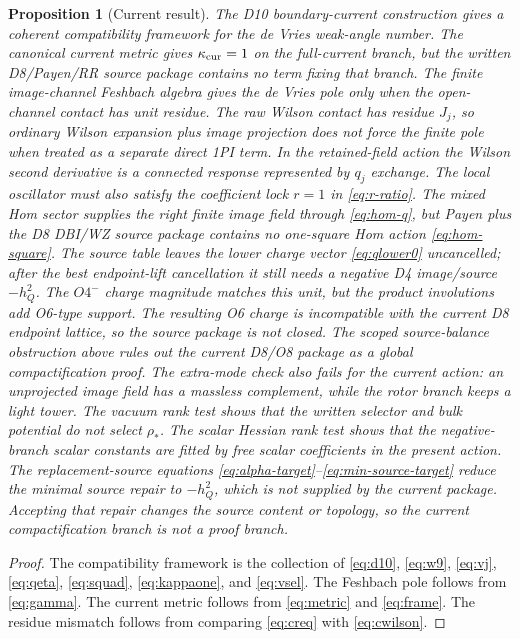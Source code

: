 \documentclass[11pt]{article}
\theoremstyle{plain}
\newtheorem{proposition}{Proposition}[section]
\theoremstyle{definition}
\begin{document}
\begin{proposition}[Current result]
The D10 boundary-current construction gives a coherent compatibility framework
for the de Vries weak-angle number.  The canonical current metric gives
\(\kappa_{\rm cur}=1\) on the full-current branch, but the written D8/Payen/RR
source package contains no term fixing that branch.  The finite image-channel
Feshbach algebra gives the de Vries pole only when the open-channel contact has
unit residue.  The raw Wilson contact has residue \(J_j\), so ordinary Wilson
expansion plus image projection does not force the finite pole when treated as
a separate direct 1PI term.  In the retained-field action the Wilson second
derivative is a connected response represented by \(q_j\) exchange.  The local
oscillator must also satisfy the coefficient lock \(r=1\) in
\eqref{eq:r-ratio}.  The mixed Hom sector supplies the right finite image
field through \eqref{eq:hom-q}, but Payen plus the D8 DBI/WZ source package
contains no one-square Hom action \eqref{eq:hom-square}.  The source
table leaves the lower charge vector \eqref{eq:qlower0} uncancelled; after the
best endpoint-lift cancellation it still needs a negative D4 image/source
\(-h_Q^2\).  The \(O4^-\) charge magnitude matches this unit, but the product
involutions add O6-type support.  The resulting O6 charge is incompatible with
the current D8 endpoint lattice, so the source package is not closed.  The
scoped source-balance obstruction above rules out the current D8/O8 package as
a global compactification proof.  The extra-mode check also fails for the
current action: an unprojected image field has a massless complement, while
the rotor branch keeps a light tower.  The vacuum rank test shows that the
written selector and bulk potential do not select \(\rho_*\).  The scalar
Hessian rank test shows that the negative-branch scalar constants are fitted by
free scalar coefficients in the present action.  The replacement-source
equations \eqref{eq:alpha-target}--\eqref{eq:min-source-target} reduce the
minimal source repair to \(-h_Q^2\), which is not supplied by the current
package.  Accepting that repair changes the source content or topology, so the
current compactification branch is not a proof branch.
\end{proposition}

\begin{proof}
The compatibility framework is the collection of \eqref{eq:d10},
\eqref{eq:w9}, \eqref{eq:vj}, \eqref{eq:qeta}, \eqref{eq:squad},
\eqref{eq:kappaone}, and \eqref{eq:vsel}.  The Feshbach pole follows from
\eqref{eq:gamma}.  The current metric follows from \eqref{eq:metric} and
\eqref{eq:frame}.  The residue mismatch follows from comparing
\eqref{eq:creq} with \eqref{eq:cwilson}.
\end{proof}
\end{document}
